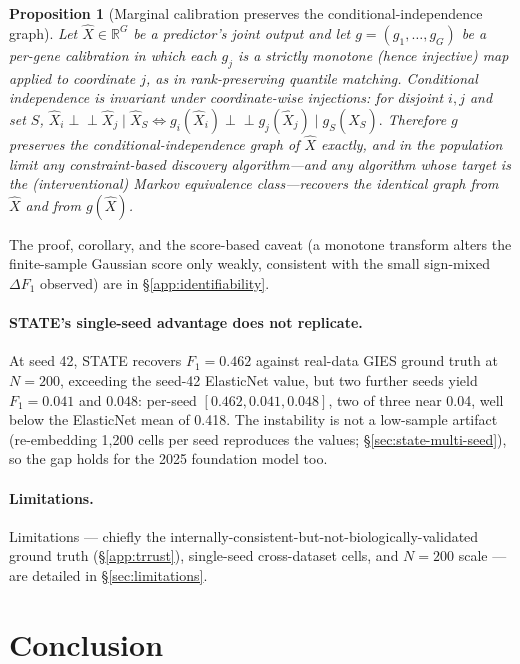 \documentclass{article}
\theoremstyle{plain}
\newtheorem{proposition}[theorem]{Proposition}
\theoremstyle{definition}
\theoremstyle{remark}
\begin{document}
\begin{proposition}[Marginal calibration preserves the conditional-independence graph]
\label{prop:ci-invariance}
Let $\hat X \in \mathbb{R}^{G}$ be a predictor's joint output and let $g=(g_1,\dots,g_G)$ be a per-gene calibration in which each $g_j$ is a strictly monotone (hence injective) map applied to coordinate $j$, as in rank-preserving quantile matching. Conditional independence is invariant under coordinate-wise injections: for disjoint $i,j$ and set $S$,
$
\hat X_i \perp\!\!\!\perp \hat X_j \mid \hat X_S \iff g_i(\hat X_i) \perp\!\!\!\perp g_j(\hat X_j) \mid g_S(\hat X_S).
$
Therefore $g$ preserves the conditional-independence graph of $\hat X$ exactly, and in the population limit any constraint-based discovery algorithm---and any algorithm whose target is the (interventional) Markov equivalence class---recovers the identical graph from $\hat X$ and from $g(\hat X)$.
\end{proposition}

The proof, corollary, and the score-based caveat (a monotone transform alters the finite-sample Gaussian score only weakly, consistent with the small sign-mixed $\Delta F_1$ observed) are in \S\ref{app:identifiability}.

\paragraph{STATE's single-seed advantage does not replicate.}
At seed 42, STATE recovers $F_1 = 0.462$ against real-data GIES ground truth at $N{=}200$, exceeding the seed-42 ElasticNet value, but two further seeds yield $F_1 = 0.041$ and $0.048$: per-seed $[0.462, 0.041, 0.048]$, two of three near 0.04, well below the ElasticNet mean of 0.418. The instability is not a low-sample artifact (re-embedding 1{,}200 cells per seed reproduces the values; \S\ref{sec:state-multi-seed}), so the gap holds for the 2025 foundation model too.

\paragraph{Limitations.}
Limitations --- chiefly the internally-consistent-but-not-biologically-validated ground truth (\S\ref{app:trrust}), single-seed cross-dataset cells, and $N{=}200$ scale --- are detailed in \S\ref{sec:limitations}.

\section{Conclusion}
\label{sec:conclusion}
\end{document}
